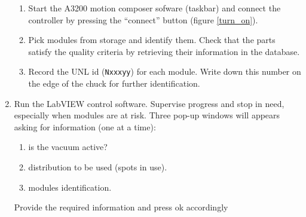 \documentclass[12pt]{unlsilabsop}
\begin{document}
\begin{enumerate}
\begin{enumerate}
        \item Start the A3200 motion composer sofware (taskbar) and connect the controller by pressing the ``connect'' button  (figure \ref{turn_on}).
       \item Pick modules from storage and identify them. Check that the parts satisfy the quality criteria by retrieving their information in the database. \label{enum:startencapsulation}
    \item Record the UNL id (\texttt{Nxxxyy}) for each module. Write down this number on the edge of the chuck for further identification.
    \end{enumerate}
  \item Run the LabVIEW control software. Supervise progress and stop in need, especially when modules are at risk. Three pop-up windows will appears asking for information (one at a time):
    \begin{enumerate}
    \item is the vacuum active?
    \item distribution to be used (spots in use).  
    \item modules identification.  
    \end{enumerate}
    Provide the required information and press ok accordingly


\end{enumerate}
\end{document}
